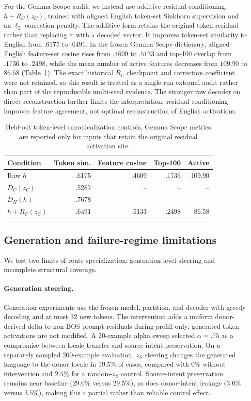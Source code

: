\documentclass[11pt]{article}
\begin{document}
For the Gemma Scope audit, we instead use additive residual conditioning, $h+R_C(z_C)$, trained with aligned English token-set Sinkhorn supervision and an $\ell_2$ correction penalty. The additive form retains the original token residual rather than replacing it with a decoded vector. It improves token-set similarity to English from $.6175$ to $.6491$. In the frozen Gemma Scope dictionary, aligned-English feature-set cosine rises from $.4609$ to $.5133$ and top-100 overlap from $.1736$ to $.2498$, while the mean number of active features decreases from $109.90$ to $86.58$ (Table~\ref{tab:app-scope-controls}). The exact historical $R_C$ checkpoint and correction coefficient were not retained, so this result is treated as a single-run external audit rather than part of the reproducible multi-seed evidence. The stronger raw decoder on direct reconstruction further limits the interpretation: residual conditioning improves feature agreement, not optimal reconstruction of English activations.

\begin{table}[H]
\centering\scriptsize
\caption{Held-out token-level canonicalization controls. Gemma Scope metrics are reported only for inputs that retain the original residual activation site.}
\label{tab:app-scope-controls}
\begin{tabular*}{\columnwidth}{@{\extracolsep{\fill}}lrrrr@{}}
\toprule
Condition & Token sim. & Feature cosine & Top-100 & Active \\
\midrule
Raw $h$ & .6175 & .4609 & .1736 & 109.90 \\
$D_C(z_C)$ & .5287 & -- & -- & -- \\
$D_H(h)$ & .7678 & -- & -- & -- \\
$h+R_C(z_C)$ & .6491 & .5133 & .2498 & 86.58 \\
\bottomrule
\end{tabular*}
\end{table}

\subsection{Generation and failure-regime limitations}
We test two limits of route specialization: generation-level steering and incomplete structural coverage.
\paragraph{Generation steering.}
Generation experiments use the frozen model, partition, and decoder with greedy decoding and at most 32 new tokens. The intervention adds a uniform donor-derived delta to non-BOS prompt residuals during prefill only; generated-token activations are not modified. A 20-example alpha sweep selected $\alpha=.75$ as a compromise between locale transfer and source-intent preservation. On a separately sampled 200-example evaluation, $z_S$ steering changes the generated language to the donor locale in $19.5\%$ of cases, compared with $0\%$ without intervention and $2.5\%$ for a random-$z_S$ control. Source-intent preservation remains near baseline ($29.0\%$ versus $29.5\%$), as does donor-intent leakage ($3.0\%$ versus $3.5\%$), making this a partial rather than reliable control effect.
\end{document}
